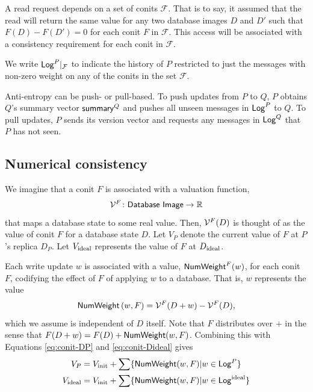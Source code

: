 \documentclass[]             %
{NASA}                       %
\theoremstyle{definition}
\begin{document}
A read request depends on a set of conits $\mathcal{F}$. That is to
say, it assumed that the read will return the same value for any two
database images $D$ and $D'$ such that $F(D) - F(D') = 0$ for each
conit $F$ in $\mathcal{F}$. This access will be associated with a
consistency requirement for each conit in $\mathcal{F}$.

We write $\mathsf{Log}^{P}|_\mathcal{F}$ to indicate the history of $P$
restricted to just the messages with non-zero weight on any of the
conits in the set $\mathcal{F}$.

Anti-entropy can be push- or pull-based. To push updates from $P$ to
$Q$, $P$ obtains $Q$'s summary vector $\mathsf{summary}^{Q}$ and pushes all
unseen messages in $\mathsf{Log}^{P}$ to $Q$. To pull updates, $P$ sends its
version vector and requests any messages in $\mathsf{Log}^{Q}$ that $P$ has not
seen.


\subsection{Numerical consistency}
\label{ssec:conit-numerical-consistency}
We imagine that a conit $F$ is associated with a valuation function,
\[
  \mathcal{V}^F\colon \mathsf{Database\ Image} \to \mathbb{R}
\]
that maps a database state to some real value. Then,
$\mathcal{V}^F(D)$ is thought of as the value of conit $F$ for a
database state $D$. Let $V_P$ denote the current value of $F$ at $P$'s
replica $D_P$. Let $V_{\textrm{ideal}}$ represents the value of $F$ at $D_{\textrm{ideal}}$.

Each write update $w$ is associated with a value, $\mathsf{NumWeight}^F(w)$,
for each conit $F$, codifying the effect of $F$ of applying $w$ to a
database. That is, $w$ represents the value
\[ \mathsf{NumWeight}\left(w, F\right) = \mathcal{V}^F(D + w) - \mathcal{V}^F(D), \] which
we assume is independent of $D$ itself. Note that $F$ distributes over
$+$ in the sense that $F(D + w) = F(D) + \mathsf{NumWeight}(w, F)$. Combining
this with Equations \eqref{eq:conit-DP} and \eqref{eq:conit-Dideal}
gives
\begin{gather}
  V_P = V_{\textrm{init}} + \sum \{\mathsf{NumWeight}(w, F) | w \in \mathsf{Log}^{P}\} \\
  V_{\textrm{ideal}} = V_{\textrm{init}} + \sum \{\mathsf{NumWeight}(w, F) | w \in \mathsf{Log}^{\textrm{ideal}}\}
\end{gather}
\end{document}
